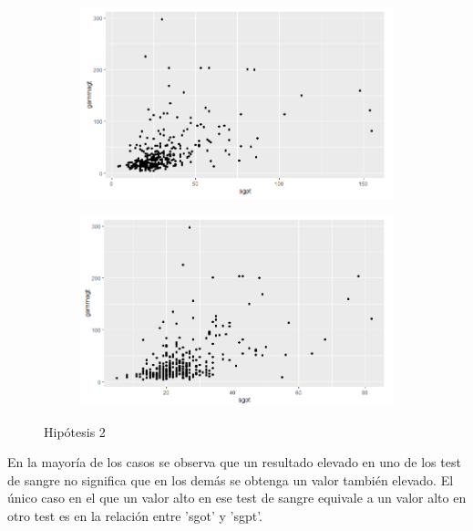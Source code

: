 \begin{figure}[!tbh]
\begin{subfigure}{0.5\textwidth}
	\includegraphics[width=1\linewidth]{figures/tesis_9}
	\caption{}
	\label{fig:tesis9}
\end{subfigure}\hfil %
\begin{subfigure}{0.5\textwidth}
	\includegraphics[width=1\linewidth]{figures/tesis_10}
	\caption{}
	\label{fig:tesis10}
\end{subfigure}\hfil %
	
	\caption{Hipótesis 2}
	\label{hipo2}
\end{figure}



En la mayoría de los casos se observa que un resultado elevado en uno de los test de sangre no significa que en los demás se obtenga un valor también elevado. El único caso en el que un valor alto en ese test de sangre equivale a un valor alto en otro test es en la relación entre 'sgot' y 'sgpt'.
	



